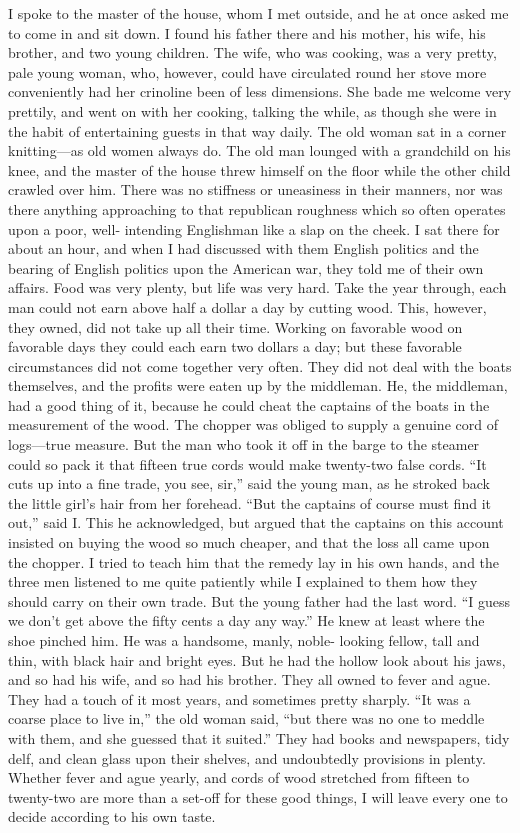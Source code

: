 I spoke to the master of the house, whom I met outside, and he at
once asked me to come in and sit down.  I found his father there
and his mother, his wife, his brother, and two young children.  The
wife, who was cooking, was a very pretty, pale young woman, who,
however, could have circulated round her stove more conveniently
had her crinoline been of less dimensions.  She bade me welcome
very prettily, and went on with her cooking, talking the while, as
though she were in the habit of entertaining guests in that way
daily.  The old woman sat in a corner knitting---as old women always
do.  The old man lounged with a grandchild on his knee, and the
master of the house threw himself on the floor while the other
child crawled over him.  There was no stiffness or uneasiness in
their manners, nor was there anything approaching to that
republican roughness which so often operates upon a poor, well-
intending Englishman like a slap on the cheek.  I sat there for
about an hour, and when I had discussed with them English politics
and the bearing of English politics upon the American war, they
told me of their own affairs.  Food was very plenty, but life was
very hard.  Take the year through, each man could not earn above
half a dollar a day by cutting wood.  This, however, they owned,
did not take up all their time.  Working on favorable wood on
favorable days they could each earn two dollars a day; but these
favorable circumstances did not come together very often.  They did
not deal with the boats themselves, and the profits were eaten up
by the middleman.  He, the middleman, had a good thing of it,
because he could cheat the captains of the boats in the measurement
of the wood.  The chopper was obliged to supply a genuine cord of
logs---true measure.  But the man who took it off in the barge to
the steamer could so pack it that fifteen true cords would make
twenty-two false cords.  ``It cuts up into a fine trade, you see,
sir,'' said the young man, as he stroked back the little girl's hair
from her forehead.  ``But the captains of course must find it out,''
said I.  This he acknowledged, but argued that the captains on this
account insisted on buying the wood so much cheaper, and that the
loss all came upon the chopper.  I tried to teach him that the
remedy lay in his own hands, and the three men listened to me quite
patiently while I explained to them how they should carry on their
own trade.  But the young father had the last word.  ``I guess we
don't get above the fifty cents a day any way.''  He knew at least
where the shoe pinched him.  He was a handsome, manly, noble-
looking fellow, tall and thin, with black hair and bright eyes.
But he had the hollow look about his jaws, and so had his wife, and
so had his brother.  They all owned to fever and ague.  They had a
touch of it most years, and sometimes pretty sharply.  ``It was a
coarse place to live in,'' the old woman said, ``but there was no one
to meddle with them, and she guessed that it suited.''  They had
books and newspapers, tidy delf, and clean glass upon their
shelves, and undoubtedly provisions in plenty.  Whether fever and
ague yearly, and cords of wood stretched from fifteen to twenty-two
are more than a set-off for these good things, I will leave every
one to decide according to his own taste.

